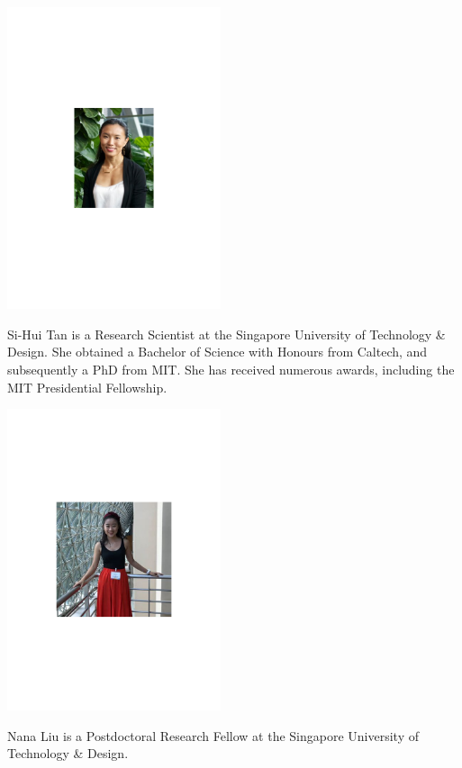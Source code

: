 
\begin{center}
\includegraphics[width=0.47\textwidth]{photo_sihui_tan}
\end{center}

Si-Hui Tan is a Research Scientist at the Singapore University of Technology \& Design. She obtained a Bachelor of Science with Honours from Caltech, and subsequently a PhD from MIT. She has received numerous awards, including the MIT Presidential Fellowship.


\begin{center}
\includegraphics[width=0.47\textwidth]{photo_nana_liu}
\end{center}

Nana Liu is a Postdoctoral Research Fellow at the Singapore University of Technology \& Design.

